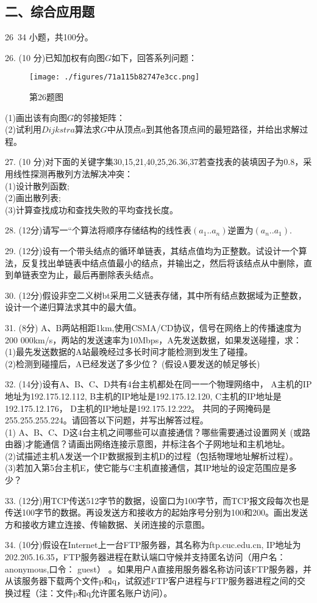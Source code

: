 \subsection{二、综合应用题}
26~34 小题，共100分。

26. (10 分)已知加权有向图$G$如下，回答系列问题： \\
\begin{figure}[ht]
\centering
\texttt{[image: ./figures/71a115b82747e3cc.png]}
\caption{第26题图} \label{fig_DNCC13_1}
\end{figure}
(1)画出该有向图$G$的邻接矩阵： \\
(2)试利用$Dijkstra$算法求$G$中从顶点$a$到其他各顶点间的最短路径，并给出求解过程。

27. (10 分)对下面的关键字集{30,15,21,40,25,26.36,37}若查找表的装填因子为$0.8$，采用线性探测再散列方法解决冲突： \\
(1)设计散列函数; \\
(2)画出散列表; \\
(3)计算查找成功和查找失败的平均查找长度。

28. (12分)请写一“个算法将顺序存储结构的线性表$(a_1..a_n)$逆置为$(a_n..a_1)$.

29. (12分)设有一个带头结点的循环单链表，其结点值均为正整数。试设计一个算法，反复找出单链表中结点值最小的结点，并输出之，然后将该结点从中删除，直到单链表空为止，最后再删除表头结点。

30. (12分)假设非空二义树bt采用二义链表存储，其中所有结点数据域为正整数，设计一个递归算法求其中的最大值。

31. (8分) A、B两站相距1km,使用CSMA/CD协议，信号在网络上的传播速度为200 000km/s，两站的发送速率为10Mbps，A先发送数据，如果发送碰撞，求： \\
(1)最先发送数据的A站最晚经过多长时间才能检测到发生了碰撞。 \\
(2)检测到碰撞后，A已经发送了多少位？ (假设A要发送的帧足够长)

32. (14分)设有A、B、C、D共有4台主机都处在同一一个物理网络中， A主机的IP地址为192.175.12.112, B主机的IP地址是192.175.12.120, C主机的IP地址是192.175.12.176， D主机的IP地址是192.175.12.222。 共同的子网掩码是255.255.255.224。请回答以下问题，并写出解答过程。 \\
(1) A、B、C、D这4台主机之间哪些可以直接通信？哪些需要通过设置网关
(或路由器)才能通信？请画出网络连接示意图，并标注各个子网地址和主机地址。 \\
(2)试描述主机A发送一个IP数据报到主机D的过程（包括物理地址解析过程）。 \\
(3)若加入第5台主机E，使它能与C主机直接通信，其IP地址的设定范围应是多少？

33. (12分)用TCP传送512字节的数据，设窗口为100字节，而TCP报文段每次也是传送100字节的数据。再设发送方和接收方的起始序号分别为100和200。画出发送方和接收方建立连接、传输数据、关闭连接的示意图。

34. (10分)假设在Internet上一台FTP服务器，其名称为ftp.cuc.edu.cn, IP地址为202.205.16.35，FTP服务器进程在默认端口守候并支持匿名访问（用户名：anonymous,口令： guest） 。如果用户A直接用服务器名称访问该FTP服务器，并从该服务器下载两个文件p和q，试叙述FTP客户进程与FTP服务器进程之间的交换过程（注：文件p和q允许匿名账户访问）。